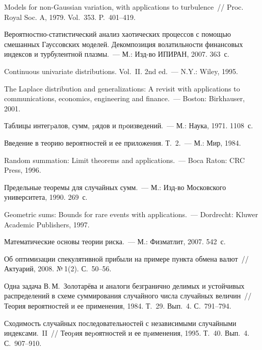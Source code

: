 \begin{multicols}{2}
{{\begin{thebibliography}{99}
Models for
non-Gaussian variation, with applications to turbulence~//
Proc. Royal Soc. A, 1979. Vol.~353. P.~401--419.

Вероятностно-статистический анализ
хаотических процессов с помощью смешанных Гауссовских моделей.
Декомпозиция волатильности финансовых индексов и турбулентной
плазмы.~--- М.: Изд-во ИПИРАН, 2007. 363~с.

Continuous univariate
distributions. Vol.~II. 2nd ed.~---  N.Y.: Wiley, 1995.

The Laplace distribution
and generalizations: A revisit with applications to
communications, economics, engineering and finance.~---
 Boston: Birkhauser, 2001.
 
Таблицы интегpалов, сумм, pядов и
пpоизведений.~---  М.: Наука, 1971. 1108~с.

Введение в теорию вероятностей и ее приложения. Т.~2.~---
М.: Мир, 1984.

Random summation: Limit
theorems and applications.~--- Boca Raton: CRC Press, 1996.
 
Предельные теоремы для случайных
сумм.~---  М.: Изд-во Московского университета, 1990. 269~с.

Geometric sums: Bounds for rare events with
applications.~--- Dordrecht: Kluwer Academic Publishers, 1997.

Математические основы
теории риска.~---  М.: Физматлит, 2007. 542~с.

Об оптимизации спекулятивной прибыли на примере
пункта обмена валют~// Актуарий, 2008. №\,1(2). С.~50--56.

Одна задача В.\,М.~Золотарёва
и аналоги безгранично делимых и устойчивых распределений в схеме
суммирования случайного числа случайных величин~// Теория
вероятностей и ее применения, 1984. Т.~29. Вып.~4. С.~791--794.

Сходимость случайных последовательностей с независимыми
случайными индексами.~II~// Теоpия веpоятностей и ее
пpименения, 1995. Т.~40. Вып.~4. С.~907--910.


\end{thebibliography}}}
\end{multicols}
